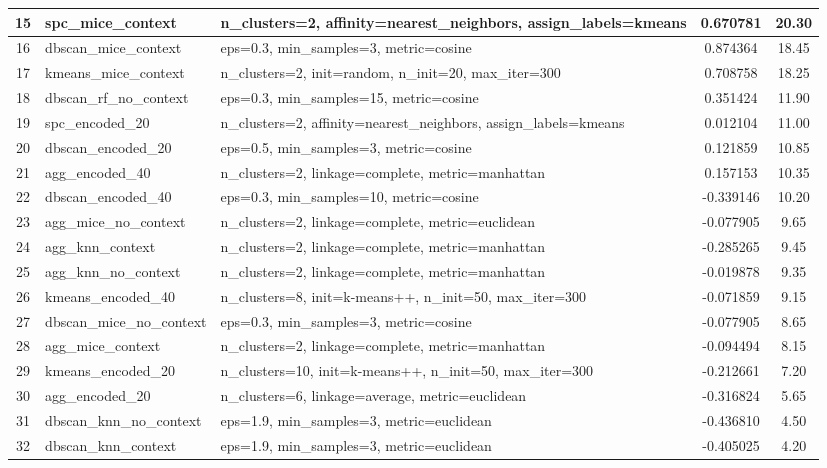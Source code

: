 \begin{table}[!ht]
{\begin{tabular}{|c|l|l|c|c|}
15 & spc\_mice\_context & n\_clusters=2, affinity=nearest\_neighbors, assign\_labels=kmeans & 0.670781 & 20.30 \\ \hline
16 & dbscan\_mice\_context & eps=0.3, min\_samples=3, metric=cosine & 0.874364 & 18.45 \\ \hline
17 & kmeans\_mice\_context & n\_clusters=2, init=random, n\_init=20, max\_iter=300 & 0.708758 & 18.25 \\ \hline
18 & dbscan\_rf\_no\_context & eps=0.3, min\_samples=15, metric=cosine & 0.351424 & 11.90 \\ \hline
19 & spc\_encoded\_20 & n\_clusters=2, affinity=nearest\_neighbors, assign\_labels=kmeans & 0.012104 & 11.00 \\ \hline
20 & dbscan\_encoded\_20 & eps=0.5, min\_samples=3, metric=cosine & 0.121859 & 10.85 \\ \hline
21 & agg\_encoded\_40 & n\_clusters=2, linkage=complete, metric=manhattan & 0.157153 & 10.35 \\ \hline
22 & dbscan\_encoded\_40 & eps=0.3, min\_samples=10, metric=cosine & -0.339146 & 10.20 \\ \hline
23 & agg\_mice\_no\_context & n\_clusters=2, linkage=complete, metric=euclidean & -0.077905 & 9.65 \\ \hline
24 & agg\_knn\_context & n\_clusters=2, linkage=complete, metric=manhattan & -0.285265 & 9.45 \\ \hline
25 & agg\_knn\_no\_context & n\_clusters=2, linkage=complete, metric=manhattan & -0.019878 & 9.35 \\ \hline
26 & kmeans\_encoded\_40 & n\_clusters=8, init=k-means++, n\_init=50, max\_iter=300 & -0.071859 & 9.15 \\ \hline
27 & dbscan\_mice\_no\_context & eps=0.3, min\_samples=3, metric=cosine & -0.077905 & 8.65 \\ \hline
28 & agg\_mice\_context & n\_clusters=2, linkage=complete, metric=manhattan & -0.094494 & 8.15 \\ \hline
29 & kmeans\_encoded\_20 & n\_clusters=10, init=k-means++, n\_init=50, max\_iter=300 & -0.212661 & 7.20 \\ \hline
30 & agg\_encoded\_20 & n\_clusters=6, linkage=average, metric=euclidean & -0.316824 & 5.65 \\ \hline
31 & dbscan\_knn\_no\_context & eps=1.9, min\_samples=3, metric=euclidean & -0.436810 & 4.50 \\ \hline
32 & dbscan\_knn\_context & eps=1.9, min\_samples=3, metric=euclidean & -0.405025 & 4.20 \\ \hline
\end{tabular}
}
\end{table}


